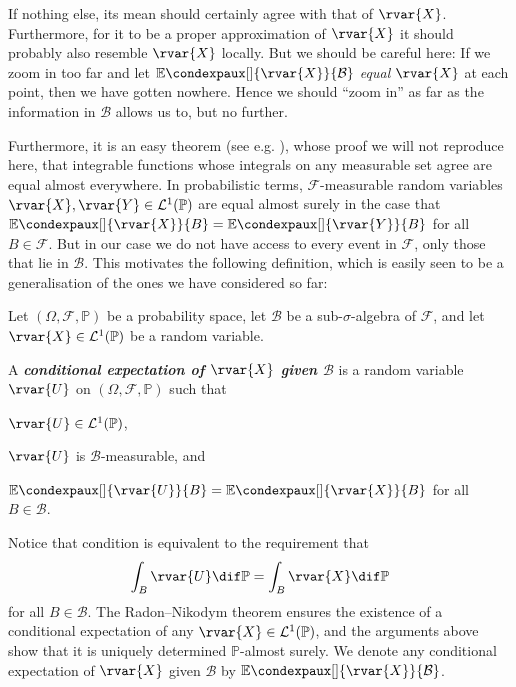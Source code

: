 \documentclass[article, a4paper, 11pt, oneside]{memoir}
\numberwithin{equation}{chapter}
\newcommand{\calB}{\mathcal{B}}
\newcommand{\calF}{\mathcal{F}}
\newcommand{\calL}{\mathcal{L}}
\renewcommand{\P}{\mathbb{P}}
\newcommand{\condexp}[3][]{{\mathbb{E}\condexpaux[#1]{#2}{#3}}}
\newcommand{\keyword}[1]{{\itshape\bfseries #1}}
\begin{document}
If nothing else, its mean should certainly agree with that of $\rvar{X}$. Furthermore, for it to be a proper approximation of $\rvar{X}$ it should probably also resemble $\rvar{X}$ locally. But we should be careful here: If we zoom in too far and let $\condexp{\rvar{X}}{\calB}$ \emph{equal} $\rvar{X}$ at each point, then we have gotten nowhere. Hence we should \enquote{zoom in} as far as the information in $\calB$ allows us to, but no further.

Furthermore, it is an easy theorem (see e.g. \cite[Sætning~10.2.1]{thorbjoernsen2014}), whose proof we will not reproduce here, that integrable functions whose integrals on any measurable set agree are equal almost everywhere. In probabilistic terms, $\calF$-measurable random variables $\rvar{X}, \rvar{Y} \in \calL^1(\P)$ are equal almost surely in the case that $\condexp{\rvar{X}}{B} = \condexp{\rvar{Y}}{B}$ for all $B \in \calF$. But in our case we do not have access to every event in $\calF$, only those that lie in $\calB$. This motivates the following definition, which is easily seen to be a generalisation of the ones we have considered so far:

\begin{definition}
    \label{def:conditional-expectation}
    Let $(\Omega, \calF, \P)$ be a probability space, let $\calB$ be a sub-$\sigma$-algebra of $\calF$, and let $\rvar{X} \in \calL^1(\P)$ be a random variable.

    A \keyword{conditional expectation of $\rvar{X}$ given $\calB$} is a random variable $\rvar{U}$ on $(\Omega, \calF, \P)$ such that
    \begin{enumdef}
        \item $\rvar{U} \in \calL^1(\P)$,
        \item $\rvar{U}$ is $\calB$-measurable, and
        \item \label{enum:conditional-expectation-local-approx} $\condexp{\rvar{U}}{B} = \condexp{\rvar{X}}{B}$ for all $B \in \calB$.
    \end{enumdef}
\end{definition}
%
Notice that condition  is equivalent to the requirement that
%
\begin{equation*}
    \int_B \rvar{U} \dif\P
        = \int_B \rvar{X} \dif\P
\end{equation*}
%
for all $B \in \calB$. The Radon--Nikodym theorem ensures the existence of a conditional expectation of any $\rvar{X} \in \calL^1(\P)$, and the arguments above show that it is uniquely determined $\P$-almost surely. We denote any conditional expectation of $\rvar{X}$ given $\calB$ by $\condexp{\rvar{X}}{\calB}$.
\end{document}
